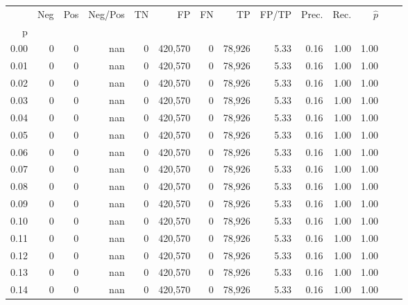 \begin{tabular}{rrrrrrrrrrrrrr}
\toprule
{} &     Neg &    Pos & Neg/Pos &       TN &       FP &      FN &      TP & FP/TP & Prec. &  Rec. & $\hat{p}$ \\
p    &         &        &         &          &          &         &         &       &       &       &           \\
\midrule
0.00 &       0 &      0 &     nan &        0 &  420,570 &       0 &  78,926 &  5.33 &  0.16 &  1.00 &      1.00 \\
0.01 &       0 &      0 &     nan &        0 &  420,570 &       0 &  78,926 &  5.33 &  0.16 &  1.00 &      1.00 \\
0.02 &       0 &      0 &     nan &        0 &  420,570 &       0 &  78,926 &  5.33 &  0.16 &  1.00 &      1.00 \\
0.03 &       0 &      0 &     nan &        0 &  420,570 &       0 &  78,926 &  5.33 &  0.16 &  1.00 &      1.00 \\
0.04 &       0 &      0 &     nan &        0 &  420,570 &       0 &  78,926 &  5.33 &  0.16 &  1.00 &      1.00 \\
0.05 &       0 &      0 &     nan &        0 &  420,570 &       0 &  78,926 &  5.33 &  0.16 &  1.00 &      1.00 \\
0.06 &       0 &      0 &     nan &        0 &  420,570 &       0 &  78,926 &  5.33 &  0.16 &  1.00 &      1.00 \\
0.07 &       0 &      0 &     nan &        0 &  420,570 &       0 &  78,926 &  5.33 &  0.16 &  1.00 &      1.00 \\
0.08 &       0 &      0 &     nan &        0 &  420,570 &       0 &  78,926 &  5.33 &  0.16 &  1.00 &      1.00 \\
0.09 &       0 &      0 &     nan &        0 &  420,570 &       0 &  78,926 &  5.33 &  0.16 &  1.00 &      1.00 \\
0.10 &       0 &      0 &     nan &        0 &  420,570 &       0 &  78,926 &  5.33 &  0.16 &  1.00 &      1.00 \\
0.11 &       0 &      0 &     nan &        0 &  420,570 &       0 &  78,926 &  5.33 &  0.16 &  1.00 &      1.00 \\
0.12 &       0 &      0 &     nan &        0 &  420,570 &       0 &  78,926 &  5.33 &  0.16 &  1.00 &      1.00 \\
0.13 &       0 &      0 &     nan &        0 &  420,570 &       0 &  78,926 &  5.33 &  0.16 &  1.00 &      1.00 \\
0.14 &       0 &      0 &     nan &        0 &  420,570 &       0 &  78,926 &  5.33 &  0.16 &  1.00 &      1.00 \\

\end{tabular}
